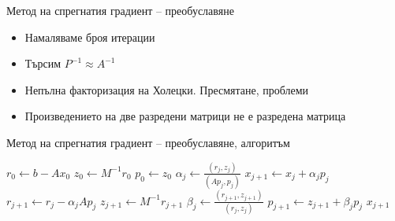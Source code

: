 \documentclass{beamer}
\begin{document}
\iffalse
\begin{frame}{Метод на спрегнатия градиент -- преобуславяне}
	\begin{itemize}
		\item Намаляваме броя итерации
		\item Търсим $P^{-1} \approx A^{-1}$
		\item Непълна факторизация на Холецки. Пресмятане, проблеми
		\item Произведението на две разредени матрици не е разредена матрица
	\end{itemize}
\end{frame}
\begin{frame}{Метод на спрегнатия градиент -- преобуславяне, алгоритъм}
\begin{algorithm}[H]
\centering
{}
\caption{Преобусловен метод на спрегнатия градиент за решаване на $Ax=b$ с начално приближение $x_0$}\label{alg:pcg}
\begin{algorithmic}[1]
			\State $r_0 \gets b - Ax_0$
			\State $z_0 \gets M^{-1}r_0$\label{alg-line:apply-preconditioner}
			\State $p_0 \gets z_0$
				\State $\alpha_j \gets \frac{(r_j, z_j)}{(Ap_j, p_j)}$
				\State $x_{j+1} \gets x_j + \alpha_j p_j$
				\State $r_{j+1} \gets r_j - \alpha_j Ap_j$
				\State $z_{j+1} \gets M^{-1}r_{j+1}$
				\State $\beta_j \gets \frac{(r_{j+1}, z_{j+1})}{(r_j, z_j)}$
				\State $p_{j+1} \gets z_{j+1} + \beta_j p_j$
			\EndFor
			\State \Return $x_{j+1}$
		\EndProcedure
\end{algorithmic}
\end{algorithm}
\end{frame}
\end{document}
